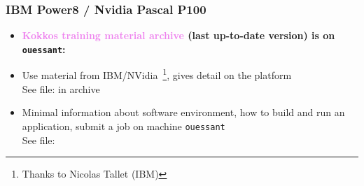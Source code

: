 \begin{frame}
  \frametitle{IBM Power8 / Nvidia Pascal P100}

  \begin{itemize}
  \item {\bf \textcolor{violet}{Kokkos training material archive} (last up-to-date version) is on \texttt{ouessant}:}\\
  \item Use material from IBM/NVidia~\footnote{Thanks to Nicolas Tallet (IBM)}, gives detail on the platform\\
      See file:  in archive
    \item Minimal information about software environment, how to build and run an application, submit a job on machine \texttt{ouessant}\\
      See file: 
  \end{itemize}

\end{frame}


